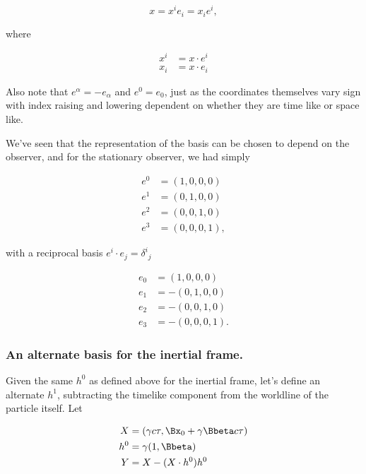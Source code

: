 \begin{equation}\label{eqn:relativisticElectrodynamicsT2:800}
x = x^i e_i = x_i e^i,
\end{equation}

where

\begin{align}\label{eqn:relativisticElectrodynamicsT2:810}
x^i &= x \cdot e^i \\
x_i &= x \cdot e_i
\end{align}

Also note that $e^\alpha = -e_\alpha$ and $e^0 = e_0$, just as the coordinates themselves vary sign with index raising and lowering dependent on whether they are time like or space like.

We've seen that the representation of the basis can be chosen to depend on the observer, and for the stationary observer, we had simply

\begin{align}\label{eqn:relativisticElectrodynamicsT2:820}
e^0 &= (1, 0, 0, 0) \\
e^1 &= (0, 1, 0, 0) \\
e^2 &= (0, 0, 1, 0) \\
e^3 &= (0, 0, 0, 1),
\end{align}

with a reciprocal basis $e^i \cdot e_j = {\delta^i}_j$

\begin{align}\label{eqn:relativisticElectrodynamicsT2:830}
e_0 &= (1, 0, 0, 0) \\
e_1 &= -(0, 1, 0, 0) \\
e_2 &= -(0, 0, 1, 0) \\
e_3 &= -(0, 0, 0, 1).
\end{align}

\subsubsection{An alternate basis for the inertial frame.}

Given the same $h^0$ as defined above for the inertial frame, let's define an alternate $h^1$, subtracting the timelike component from the worldline of the particle itself.  Let

\begin{align*}
X &= ( \gamma c \tau, \Bx_0 + \gamma \Bbeta c \tau ) \\
h^0 &= \gamma ( 1, \Bbeta ) \\
Y & = X - (X \cdot h^0) h^0 
\end{align*}

